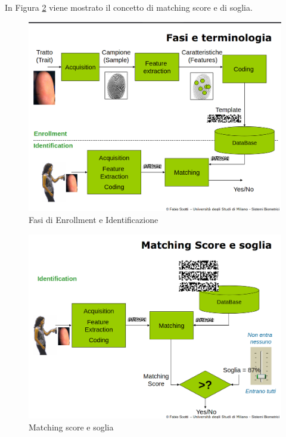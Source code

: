 \noindent In Figura \ref{fig:matching-score} viene mostrato il concetto di matching score e di soglia.

\begin{figure}
    \centering
    \includegraphics[width=0.95\linewidth]{chapters/images-chap1/enrollment-identification.png}
    \caption{Fasi di Enrollment e Identificazione}
    \label{fig:enroll-ident}
\end{figure}

\begin{figure}
    \centering
    \includegraphics[width=0.95\linewidth]{chapters/images-chap1/matching-score.png}
    \caption{Matching score e soglia}
    \label{fig:matching-score}
\end{figure}

\newpage

